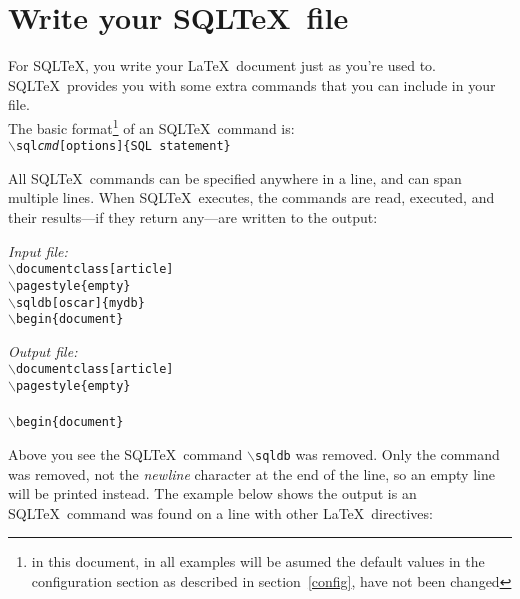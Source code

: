 \documentclass{article}
\newcommand{\bs}{\ensuremath{\backslash}}
\newcommand{\vs}{\vspace{3mm}}
\begin{document}
\section{Write your SQL\TeX\ file}

For SQL\TeX, you write your \LaTeX\ document just as you're used to. SQL\TeX\ provides you with
some extra commands that you can include in your file.\\
The basic format\footnote{in this document, in all examples will be asumed the default values in the
configuration section as described in section~\ref{config}, have not been changed} of an SQL\TeX\ command is: \\
\texttt{\bs sql\emph{cmd}[options]\{SQL statement\}}

\vs

All SQL\TeX\ commands can be specified anywhere in a line, and can span multiple lines.
When SQL\TeX\ executes, the commands are read, executed, and their results---if they return
any---are written to the output:

\vs

\begin{minipage}[t]{0.5\textwidth}\textsl{Input file:}\\\texttt{\footnotesize{\bs documentclass[article] \\
\bs pagestyle\{empty\} \\
\bs sqldb[oscar]\{mydb\} \\
\bs begin\{document\} \\
}}\end{minipage}\hfill\begin{minipage}[t]{0.5\textwidth}\textsl{Output file:}\\\texttt{\footnotesize{\bs documentclass[article] \\
\bs pagestyle\{empty\} \\
 \\
\bs begin\{document\} \\
}}\end{minipage}

\vs

Above you see the SQL\TeX\ command \texttt{\bs sqldb} was removed. Only the command was removed, not
the \textsl{newline} character at the end of the line, so an empty line will be printed instead.
The example below shows the output is an SQL\TeX\ command was found on a line with other \LaTeX\
directives:

\vs
\end{document}

